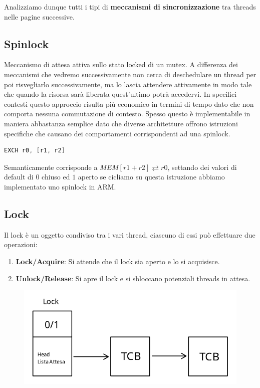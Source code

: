 \documentclass{article}
\begin{document}
Analizziamo dunque tutti i tipi di \textbf{meccanismi di sincronizzazione} tra threads nelle pagine successive.

\subsection{Spinlock}

Meccanismo di attesa attiva sullo stato locked di un mutex. A differenza dei meccanismi che vedremo successivamente
non cerca di deschedulare un thread per poi risvegliarlo successivamente, ma lo lascia attendere attivamente in modo tale che
quando la risorsa sarà liberata quest'ultimo potrà accedervi. In specifici contesti questo approccio risulta più economico in termini di tempo
dato che non comporta nessuna commutazione di contesto. Spesso questo è implementabile in maniera abbastanza semplice dato che diverse architetture offrono
istruzioni specifiche che causano dei comportamenti corrispondenti ad una spinlock.

\vspace*{5px}

\begin{lstlisting}[language = C]
    EXCH r0, [r1, r2]
\end{lstlisting}

\vspace*{-8px}

Semanticamente corrisponde a $ MEM[r1+r2] \rightleftarrows r0 $, settando dei valori di default di $0$ chiuso ed $1$ aperto se cicliamo su questa istruzione abbiamo implementato uno spinlock in ARM.

\newpage

\subsection{Lock}

Il lock è un oggetto condiviso tra i vari thread, ciascuno di essi può effettuare due operazioni:

\begin{enumerate}
    \item \textbf{Lock/Acquire}: Si attende che il lock sia aperto e lo si acquisisce.
    \item \textbf{Unlock/Release}: Si apre il lock e si sbloccano potenziali threads in attesa.
\end{enumerate}

\begin{figure}[htbp]
    \center
    \includegraphics[scale=0.325]{img/rappresentazione_lock.png}
\end{figure}
\end{document}
